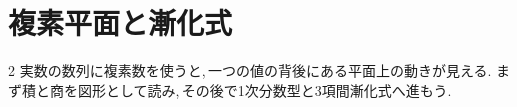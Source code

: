 \chapter{複素平面と漸化式}\label{章：複素平面と漸化式}
\begin{multicols}{2}
実数の数列に複素数を使うと,\,一つの値の背後にある平面上の動きが見える.
まず積と商を図形として読み,\,その後で1次分数型と3項間漸化式へ進もう.





\end{multicols}

